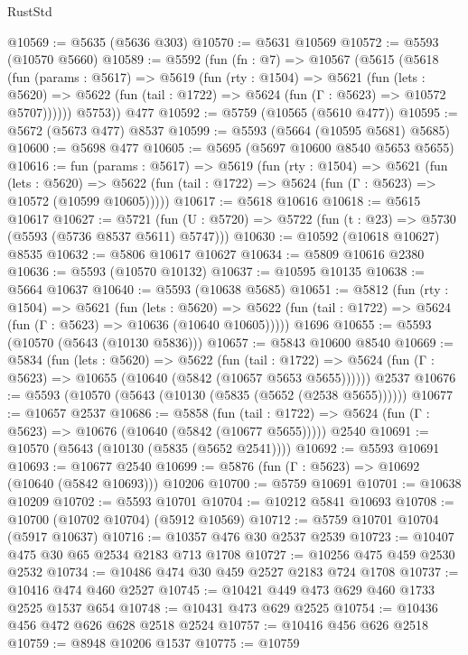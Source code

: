 \begin{lexlean}{RustStd}
\begin{coremodule}
@10569 := @5635 (@5636 @303)
@10570 := @5631 @10569
@10572 := @5593 (@10570 @5660)
@10589 := @5592
    (fun (fn : @7) =>
    @10567
      (@5615
        (@5618
          (fun (params : @5617) =>
          @5619
            (fun (rty : @1504) =>
            @5621
              (fun (lets : @5620) =>
              @5622 (fun (tail : @1722) => @5624 (fun (Γ : @5623) => @10572 @5707))))))
        @5753))
    @477
@10592 := @5759 (@10565 (@5610 @477))
@10595 := @5672 (@5673 @477) @8537
@10599 := @5593 (@5664 (@10595 @5681) @5685)
@10600 := @5698 @477
@10605 := @5695 (@5697 @10600 @8540 @5653 @5655)
@10616 := fun (params : @5617) =>
  @5619
    (fun (rty : @1504) =>
    @5621
      (fun (lets : @5620) =>
      @5622 (fun (tail : @1722) => @5624 (fun (Γ : @5623) => @10572 (@10599 @10605)))))
@10617 := @5618 @10616
@10618 := @5615 @10617
@10627 := @5721
    (fun (U : @5720) => @5722 (fun (t : @23) => @5730 (@5593 (@5736 @8537 @5611) @5747)))
@10630 := @10592 (@10618 @10627) @8535
@10632 := @5806 @10617 @10627
@10634 := @5809 @10616 @2380
@10636 := @5593 (@10570 @10132)
@10637 := @10595 @10135
@10638 := @5664 @10637
@10640 := @5593 (@10638 @5685)
@10651 := @5812
    (fun (rty : @1504) =>
    @5621
      (fun (lets : @5620) =>
      @5622 (fun (tail : @1722) => @5624 (fun (Γ : @5623) => @10636 (@10640 @10605)))))
    @1696
@10655 := @5593 (@10570 (@5643 (@10130 @5836)))
@10657 := @5843 @10600 @8540
@10669 := @5834
    (fun (lets : @5620) =>
    @5622
      (fun (tail : @1722) =>
      @5624 (fun (Γ : @5623) => @10655 (@10640 (@5842 (@10657 @5653 @5655))))))
    @2537
@10676 := @5593 (@10570 (@5643 (@10130 (@5835 (@5652 (@2538 @5655))))))
@10677 := @10657 @2537
@10686 := @5858
    (fun (tail : @1722) => @5624 (fun (Γ : @5623) => @10676 (@10640 (@5842 (@10677 @5655)))))
    @2540
@10691 := @10570 (@5643 (@10130 (@5835 (@5652 @2541))))
@10692 := @5593 @10691
@10693 := @10677 @2540
@10699 := @5876 (fun (Γ : @5623) => @10692 (@10640 (@5842 @10693))) @10206
@10700 := @5759 @10691
@10701 := @10638 @10209
@10702 := @5593 @10701
@10704 := @10212 @5841 @10693
@10708 := @10700 (@10702 @10704) (@5912 @10569)
@10712 := @5759 @10701 @10704 (@5917 @10637)
@10716 := @10357 @476 @30 @2537 @2539
@10723 := @10407 @475 @30 @65 @2534 @2183 @713 @1708
@10727 := @10256 @475 @459 @2530 @2532
@10734 := @10486 @474 @30 @459 @2527 @2183 @724 @1708
@10737 := @10416 @474 @460 @2527
@10745 := @10421 @449 @473 @629 @460 @1733 @2525 @1537 @654
@10748 := @10431 @473 @629 @2525
@10754 := @10436 @456 @472 @626 @628 @2518 @2524
@10757 := @10416 @456 @626 @2518
@10759 := @8948 @10206 @1537
@10775 := @10759

\end{coremodule}
\end{lexlean}
